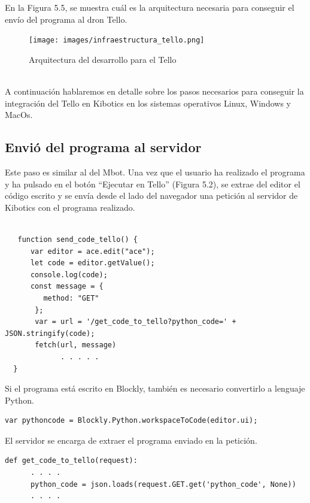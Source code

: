 \documentclass{report}
\begin{document}
En la Figura 5.5, se muestra cuál es la arquitectura necesaria para conseguir el envío del programa al dron Tello.
\\
\begin{figure}[h!]
  \centering
    \texttt{[image: images/infraestructura\_tello.png]}
  \caption{Arquitectura del desarrollo para el Tello}
  \label{Arquitectura del desarrollo para el Tello}
\end{figure}
\\
A continuación hablaremos en detalle sobre los pasos necesarios para conseguir la integración del Tello en Kibotics en los sistemas operativos Linux, Windows y MacOs.

\subsection{Envió del programa al servidor}

Este paso es similar al del Mbot. Una vez que el usuario ha realizado el programa y ha pulsado en el botón “Ejecutar en Tello” (Figura 5.2), se extrae del editor el código escrito y se envía desde el lado del navegador una petición al servidor de Kibotics con el programa realizado.
\\
\begin{lstlisting}[frame=single,breaklines=true, label=Envio del programa desde el navegador al servidor", caption=Envio del programa desde el navegador al servidor,captionpos=b]
   
   function send_code_tello() {
      var editor = ace.edit("ace");
      let code = editor.getValue();
      console.log(code);
      const message = {
         method: "GET"
       };
       var = url = '/get_code_to_tello?python_code=' + JSON.stringify(code);
       fetch(url, message)
             . . . . .
  }
\end{lstlisting}

Si el programa está escrito en Blockly, también es necesario convertirlo a lenguaje Python.
\\
\begin{lstlisting}[frame=single,breaklines=true, label=Convertir de Blockly a Python, caption=Convertir de Blockly a Python,captionpos=b]
   var pythoncode = Blockly.Python.workspaceToCode(editor.ui);
\end{lstlisting}

El servidor se encarga de extraer el programa enviado en la petición.
\\
\begin{lstlisting}[frame=single,breaklines=true, label=Extracción programa en el servidor, caption=Extracción programa en el servidor, captionpos=b]
   def get_code_to_tello(request):
      . . . .
      python_code = json.loads(request.GET.get('python_code', None))
      . . . .

\end{lstlisting}	
\end{document}
